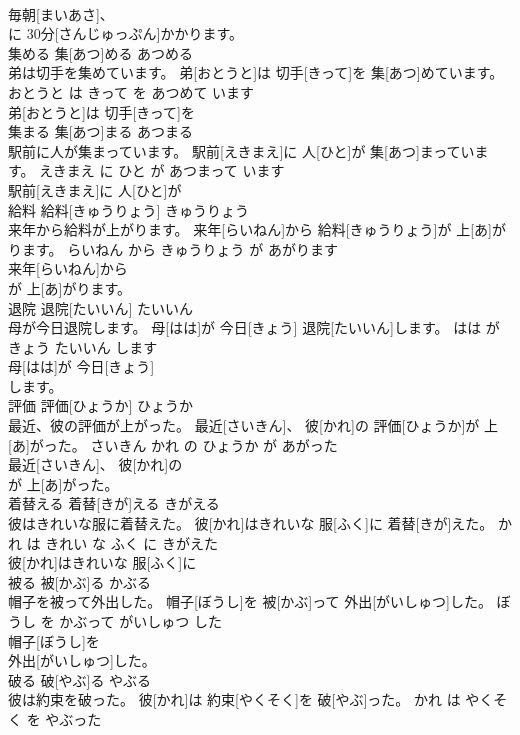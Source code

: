 \documentclass[8pt]{extreport}
\begin{document}
\begin{CJK}{UTF8}{min}
\\	毎朝[まいあさ]、
\\	に 30分[さんじゅっぷん]かかります。			
\\	集める	集[あつ]める	あつめる	
\\	弟は切手を集めています。	弟[おとうと]は 切手[きって]を 集[あつ]めています。	おとうと は きって を あつめて います	
\\	弟[おとうと]は 切手[きって]を
\\	集まる	集[あつ]まる	あつまる	
\\	駅前に人が集まっています。	駅前[えきまえ]に 人[ひと]が 集[あつ]まっています。	えきまえ に ひと が あつまって います	
\\	駅前[えきまえ]に 人[ひと]が
\\	給料	給料[きゅうりょう]	きゅうりょう	
\\	来年から給料が上がります。	来年[らいねん]から 給料[きゅうりょう]が 上[あ]がります。	らいねん から きゅうりょう が あがります	
\\	来年[らいねん]から
\\	が 上[あ]がります。			
\\	退院	退院[たいいん]	たいいん	
\\	母が今日退院します。	母[はは]が 今日[きょう] 退院[たいいん]します。	はは が きょう たいいん します	
\\	母[はは]が 今日[きょう]
\\	します。			
\\	評価	評価[ひょうか]	ひょうか	
\\	最近、彼の評価が上がった。	最近[さいきん]、 彼[かれ]の 評価[ひょうか]が 上[あ]がった。	さいきん かれ の ひょうか が あがった	
\\	最近[さいきん]、 彼[かれ]の
\\	が 上[あ]がった。			
\\	着替える	着替[きが]える	きがえる	
\\	彼はきれいな服に着替えた。	彼[かれ]はきれいな 服[ふく]に 着替[きが]えた。	かれ は きれい な ふく に きがえた	
\\	彼[かれ]はきれいな 服[ふく]に
\\	被る	被[かぶ]る	かぶる	
\\	帽子を被って外出した。	帽子[ぼうし]を 被[かぶ]って 外出[がいしゅつ]した。	ぼうし を かぶって がいしゅつ した	
\\	帽子[ぼうし]を
\\	外出[がいしゅつ]した。			
\\	破る	破[やぶ]る	やぶる	
\\	彼は約束を破った。	彼[かれ]は 約束[やくそく]を 破[やぶ]った。	かれ は やくそく を やぶった	

\end{CJK}
\end{document}
